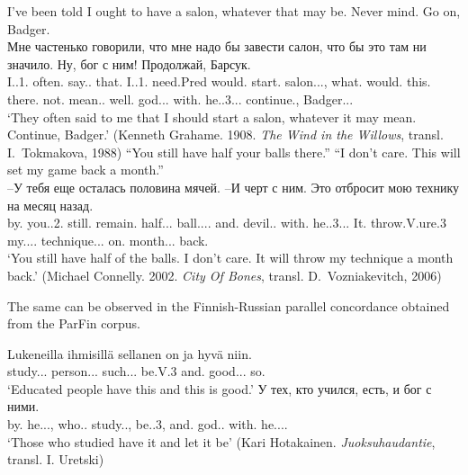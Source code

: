 \documentclass[output=paper]{langscibook}
\begin{document}
\ea
\ea
 I’ve been told I ought to have a salon, whatever that may be. Never mind. Go on, Badger. \\
\gll  Мне частенько говорили, что мне надо бы завести салон, что бы это там ни значило. Ну, бог с ним! Продолжай, Барсук.\\
     I.{\PRON}.1.{\DAT}{\SG} often.{\ADV} say.{\PAST}.{\PL} that.{\PRON} I.{\PRON}.1.{\DAT}{\SG} need.Pred would.{\PTCP} start.{\glossINF} salon.{\NOUN}.{\ACC}.{\SG}, what.{\PRON} would.{\PTCP} this.{\PRON} there.{\ADV} not.{\PTCP} mean.{\PAST}. well.{\PTCP} god.{\NOUN}.{\NOM}.{\SG} with.{\PREP} he.{\PRON}.3.{\INSTR}.{\SG}. continue.{\IMP}, Badger.{\NOUN}.{\NOM}.\\
\glt `They often said to me that I should start a salon, whatever it may mean. Continue, Badger.' (Kenneth Grahame. 1908. \textit{The Wind in the Willows}, transl. I.~Tokmakova, 1988)
\ex
  “You still have half your balls there.” “I don’t care. This will set my game back a month.”\\
\gll –У тебя еще осталась половина мячей. –И черт с ним. Это отбросит мою технику на месяц назад.\\
     by.{\PREP} you.{\PRON}.2.{\GEN}{\SG} still.{\PTCP} remain.{\PAST}{\glossF}{\SG} half.{\NOUN}.{\NOM}.{\SG} ball.{\NOUN}.{\GEN}.{\PL}. and.{\PTCP} devil.{\NOUN}.{\NOM} with.{\PREP} he.{\PRON}.3.{\INSTR}.{\SG}. It.{\PRON} throw.V.{\FUT}ure.3{\SG} my.{\PRON}.{\POSS}{\glossF}.{\ACC}.{\SG} technique.{\NOUN}.{\ACC}.{\SG} on.{\PREP} month.{\NOUN}.{\ACC}.{\SG} back.{\ADV}\\
\glt `You still have half of the balls. I don’t care. It will throw my technique a month back.' (Michael Connelly. 2002. \textit{City Of Bones}, transl. D.~Vozniakevitch, 2006)
\z
\z

The same can be observed in the Finnish-Russian parallel concordance obtained from the ParFin corpus.

\ea \gll Lukeneilla ihmisillä sellanen on ja hyvä niin.\\
     study.{\PTCP}.{\ALL}.{\PL} person.{\NOUN}.{\ALL}.{\PL} such.{\ADJ}.{\NOM}.{\SG} be.V.3{\PRES}{\SG} and.{\CONJ} good.{\ADJ}.{\NOM}.{\SG} so.{\ADV}\\
\glt `Educated people have this and this is good.'
\ex
\gll У тех, кто учился, есть, и бог с ними.\\
     by.{\PREP} he.{\PRON}.{\GEN}.{\PL}, who.{\PRON}.{\NOM} study.{\PAST}.{\glossM}{\SG}, be.{\PRES}.3, and.{\PTCP} god.{\NOUN}.{\NOM} with.{\PREP} he.{\PRON}.{\INSTR}.{\PL}.\\
\glt `Those who studied have it and let it be' (Kari Hotakainen. \textit{Juoksuhaudantie}, transl. I. Uretski)
\end{document}
